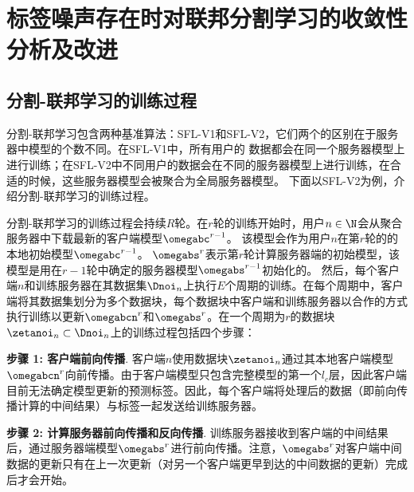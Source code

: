 \chapter{标签噪声存在时对联邦分割学习的收敛性分析及改进}
\section{分割-联邦学习的训练过程}
分割-联邦学习包含两种基准算法：SFL-V1和SFL-V2，它们两个的区别在于服务器中模型的个数不同。在SFL-V1中，所有用户的
数据都会在同一个服务器模型上进行训练；在SFL-V2中不同用户的数据会在不同的服务器模型上进行训练，在合适的时候，这些服务器模型会被聚合为全局服务器模型。
下面以SFL-V2为例，介绍分割-联邦学习的训练过程。

分割-联邦学习的训练过程会持续$R$轮。在$r$轮的训练开始时，用户$n\in \N$会从聚合服务器中下载最新的客户端模型$\omegabc^{r-1}$。
该模型会作为用户$n$在第$r$轮的的本地初始模型$\omegabc^{r-1}$。
$\omegabs^{r}$表示第$r$轮计算服务器端的初始模型，该模型是用在$r-1$轮中确定的服务器模型$\omegabs^{r-1}$初始化的。
然后，每个客户端$n$和训练服务器在其数据集$\Dnoi_n$上执行$E$个周期的训练。在每个周期中，客户端将其数据集划分为多个数据块，每个数据块中客户端和训练服务器以合作的方式执行训练以更新$\omegabcn^{r}$和$\omegabs^r$。在一个周期为$r$的数据块$\zetanoi_n\subset\Dnoi_n$上的训练过程包括四个步骤：

\textbf{步骤 1: 客户端前向传播}. 客户端$n$使用数据块$\zetanoi_n$通过其本地客户端模型$\omegabcn^{r}$向前传播。由于客户端模型只包含完整模型的第一个$l_c$层，因此客户端目前无法确定模型更新的预测标签。因此，每个客户端将处理后的数据（即前向传播计算的中间结果）与标签一起发送给训练服务器。

\textbf{步骤 2: 计算服务器前向传播和反向传播}. 训练服务器接收到客户端的中间结果后，通过服务器端模型$\omegabs^{r}$进行前向传播。注意，$\omegabs^{r}$对客户端中间数据的更新只有在上一次更新（对另一个客户端更早到达的中间数据的更新）完成后才会开始。

